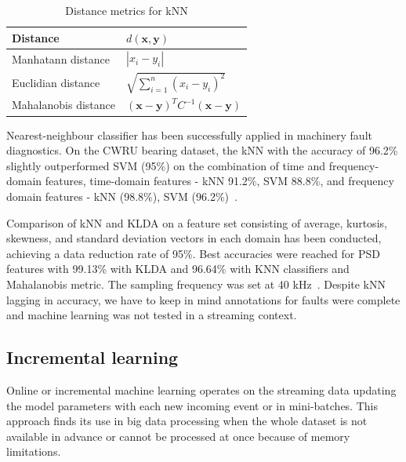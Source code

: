 \begin{table}[ht]
\centering
\renewcommand{\arraystretch}{2}
\begin{tabular}{|l|l|}
\hline
\textbf{Distance}     & \textbf{$d(\mathbf{x}, \mathbf{y})$}                                   \\ \hline
Manhatann distance	 & $ |x_i - y_i| $													   \\ \hline
Euclidian distance    & $ \sqrt{\sum_{i = 1}^{n}(x_i - y_i)^2} $                               \\ \hline
Mahalanobis distance  & $ (\mathbf{x} - \mathbf{y})^T C^{-1} (\mathbf{x} - \mathbf{y}) $       \\ \hline
\end{tabular}
\caption{Distance metrics for kNN}
\label{tab:knn-distance}
\end{table}

Nearest-neighbour classifier has been successfully applied in machinery fault diagnostics. On the CWRU bearing dataset, the kNN with the accuracy of 96.2\% slightly outperformed SVM (95\%) on the combination of time and frequency-domain features, time-domain features - kNN 91.2\%, SVM 88.8\%, and frequency domain features - kNN (98.8\%), SVM (96.2\%)~\cite{jamil_feature-based_2021}. 

Comparison of kNN and KLDA on a feature set consisting of average, kurtosis, skewness, and standard deviation vectors in each domain has been conducted, achieving a data reduction rate of 95\%. Best accuracies were reached for PSD features with 99.13\% with KLDA and 96.64\% with KNN classifiers and Mahalanobis metric. The sampling frequency was set at 40 kHz~\cite{altaf_new_2022}. Despite kNN lagging in accuracy, we have to keep in mind annotations for faults were complete and machine learning was not tested in a streaming context.

\subsection{Incremental learning}
Online or incremental machine learning operates on the streaming data updating the model parameters with each new incoming event or in mini-batches. This approach finds its use in big data processing when the whole dataset is not available in advance or cannot be processed at once because of memory limitations. 

